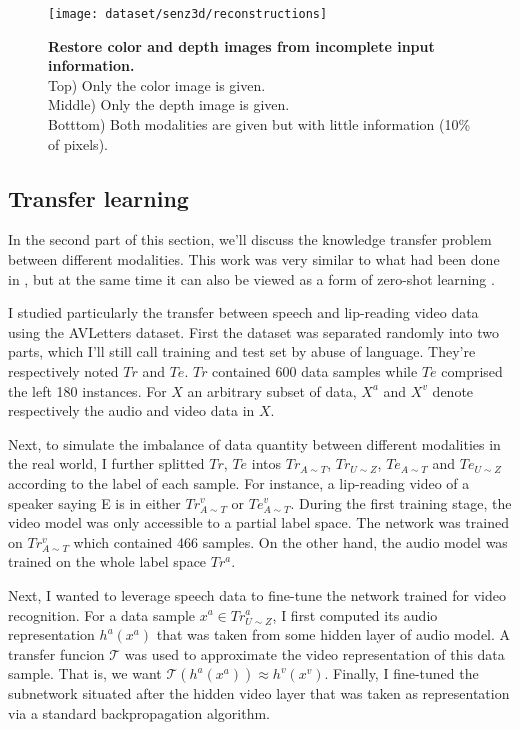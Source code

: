 \begin{figure}[H]
  \centering
  \texttt{[image: dataset/senz3d/reconstructions]}\\[-1em]
  \caption{%
    \textbf{Restore color and depth images from incomplete input
      information.}\\[0.1em]
    Top) Only the color image is given.\\[0.1em]
    Middle) Only the depth image is given.\\[0.1em]
    Botttom) Both modalities are given but with little information
      (10\% of pixels).}
  \label{fig:color_depth_restoration}
\end{figure}

\subsection{Transfer learning} \label{subsection:AVSR_transfer}

In the second part of this section, we'll discuss the knowledge transfer
problem between different modalities. This work was very similar to what
had been done in \cite{S. Moon 2015}, but at the same time it can also be
viewed as a form of zero-shot learning \cite{A. Frome 2013, R. Socher 2013}.

I studied particularly the transfer between speech and lip-reading
video data using the AVLetters dataset. First the dataset was separated
randomly into two parts, which I'll still call training and test set
by abuse of language. They're respectively noted $Tr$ and $Te$.
$Tr$ contained 600 data samples while $Te$ comprised the left 180 instances.
For $X$ an arbitrary subset of data, $X^a$ and $X^v$ denote respectively
the audio and video data in $X$.

Next, to simulate the imbalance of data quantity between different
modalities in the real world, I further splitted $Tr$, $Te$ intos
$Tr_{A\sim T}$, $Tr_{U\sim Z}$, $Te_{A\sim T}$ and $Te_{U\sim Z}$
according to the label of each sample.
For instance, a lip-reading video of a speaker saying E is in either
$Tr_{A\sim T}^v$ or $Te_{A\sim T}^v$.
During the first training stage, the video model was only accessible
to a partial label space. The network was trained on $Tr_{A\sim T}^v$
which contained 466 samples. On the other hand, the audio model was trained
on the whole label space $Tr^a$.

Next, I wanted to leverage speech data to fine-tune the network trained for
video recognition. For a data sample $x^a\in Tr_{U\sim Z}^a$, I first
computed its audio representation $h^a(x^a)$ that was taken from some
hidden layer of audio model. A transfer funcion $\mathcal{T}$ was used
to approximate the video representation of this data sample.
That is, we want $\mathcal{T}(h^a(x^a))\approx h^v(x^v)$. Finally, I
fine-tuned the subnetwork situated after the hidden video layer that
was taken as representation via a standard backpropagation algorithm.

